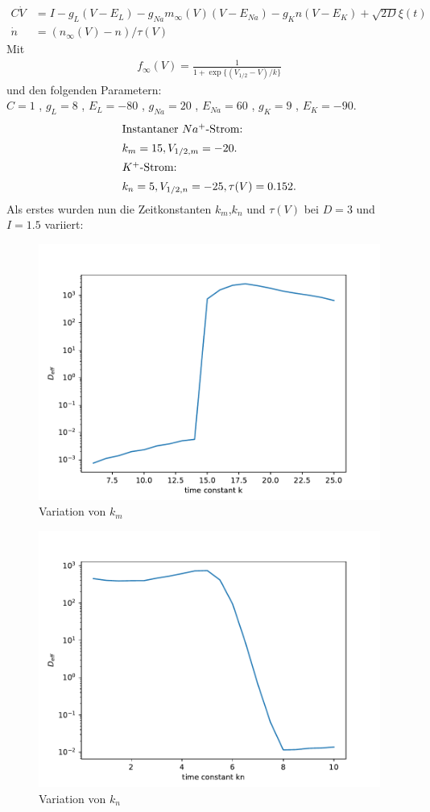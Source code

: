 \documentclass[12pt,a4paper]{article}
\begin{document}
\begin{align*}
C\dot{V} &= I - g_L(V-E_L) - g_{Na}m_{\infty}(V)(V-E_{Na}) - g_Kn(V-E_K)+\sqrt{2D}\xi(t)\\
\dot{n} &= (n_{\infty}(V)-n)/\tau(V)
\end{align*}
Mit
\begin{align*}
f_{\infty}(V) = \frac{1}{1+\exp\{(V_{1/2}-V)/k\}}
\end{align*}
und den folgenden Parametern:\\
$C=1$ , $g_L=8$ , $E_L=-80$ , $g_{Na}=20$ , $E_{Na}=60$ , $g_K=9$ , $E_K=-90$.
\begin{align*}
\intertext{Instantaner $Na^+$-Strom:} &k_m=15 , V_{1/2,m}=-20. 
\\
\intertext{$K^+$-Strom:} &k_n=5 , V_{1/2,n}=-25 , \tau(V)=0.152.
\end{align*}
Als erstes wurden nun die Zeitkonstanten $k_m$,$k_n$ und $\tau(V)$ bei $D=3$ und $I=1.5$ variiert:
\begin{figure}[H]
	\centering
	\includegraphics[scale=0.9]{dneurkvar.pdf} 
	\caption{Variation von $k_m$}
	\label{kmvar}
\end{figure} 
\begin{figure}[H]
	\centering
	\includegraphics[scale=0.9]{dneurknnvar.pdf} 
	\caption{Variation von $k_n$}
	\label{knvar}
\end{figure} 
\end{document}
